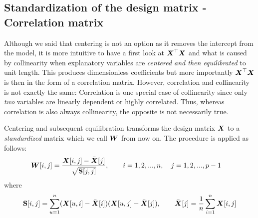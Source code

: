 \documentclass[11pt,a4paper,twoside]{book}\usepackage[]{graphicx}\usepackage[]{xcolor}
\begin{document}
\subsection{Standardization of the design matrix - Correlation matrix}\label{sec:transformX}

Although we said that centering is not an option as it removes the intercept from the model, it is more intuitive to have a first look at ${\boldsymbol{X}}^\top {\boldsymbol{X}}$ and what is caused by collinearity when explanatory variables are \textit{centered and then equilibrated} to unit length. This produces dimensionless coefficients but more importantly ${\boldsymbol{X}}^\top {\boldsymbol{X}}$ is then in the form of a correlation matrix. However, correlation and collinearity is not exactly the same: Correlation is one special case of collinearity since only \textit{two} variables are linearly dependent or highly correlated. Thus, whereas correlation is also always collinearity, the opposite is not necessarily true.

Centering and subsequent equilibration transforms the design matrix ${\boldsymbol{X}}$ to a \textit{standardized} matrix which we call ${\boldsymbol{W}}$ from now on. The procedure is applied as follows:
\begin{align*}
{\boldsymbol{W}}[i,j]&=\frac{{\boldsymbol{X}}[i,j]-\bar{{\boldsymbol{X}}}[j]}{\sqrt{{\mathbf{S}}[j,j]}},\qquad i=1,2,...,n,\quad j=1,2,...,p-1
\end{align*}
where
\begin{align*}
{\mathbf{S}}[i,j]=\sum_{u=1}^{n}({\boldsymbol{X}}[u,i]-\bar{{\boldsymbol{X}}}[i])({\boldsymbol{X}}[u,j]-\bar{{\boldsymbol{X}}}[j]),\qquad
\bar{{\boldsymbol{X}}}[j]=\frac{1}{n}\sum_{i=1}^{n}{\boldsymbol{X}}[i,j]
\end{align*}
\end{document}
